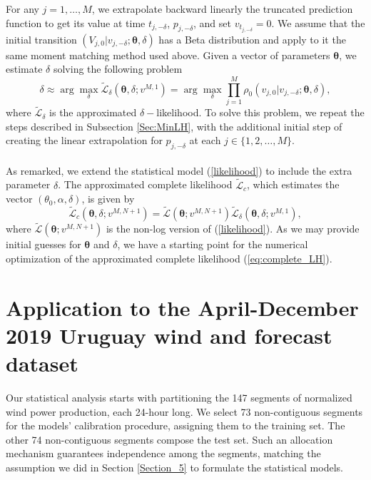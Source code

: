 \documentclass[11pt]{article}
\theoremstyle{definition}
\begin{document}
For any $j=1, \ldots, M$, we extrapolate backward linearly the truncated prediction function to get its value at time $t_{j,-\delta}$, $p_{j,-\delta}$, and set $v_{t_{j,-\delta}}=0$. We assume that the initial transition $(V_{j, 0}|v_{j,-\delta};\bm{\theta},\delta)$ 
has a Beta distribution and apply to it the same moment matching method used above. Given a vector of parameters $\bm{\theta}$, we estimate $\delta$ solving the following problem
\begin{equation}
\delta\approx\arg\max_{\delta}\tilde{\mathcal{L}}_{\delta}\left(\bm{\theta},\delta; v^{M,1}\right) = \arg\max_{\delta}\prod\limits_{j=1}^M \rho_0 \left(v_{j, 0}|v_{j,-\delta};\bm{\theta},\delta\right),
\label{eq:likelihood_delta}
\end{equation}
where $\tilde{\mathcal{L}}_\delta$ is the approximated $\delta-$likelihood. To solve this problem, we repeat the steps described in Subsection \ref{Sec:MinLH}, with the additional initial step of creating the linear extrapolation for $p_{j,-\delta}$ at each $j\in\{1,2,\dots,M\}$.\\
\quad\\
As remarked, we extend the statistical model (\ref{likelihood}) to include the extra parameter $\delta$. The approximated complete likelihood $\tilde{\mathcal{L}}_c$, which estimates the vector $(\theta_0,\alpha,\delta)$, is given by
\begin{equation}
\tilde{\mathcal{L}}_c\left(\bm{\theta},\delta; v^{M,N +1}\right)=\tilde{\mathcal{L}}\left(\bm{\theta}; v^{M,N +1}\right)\tilde{\mathcal{L}}_{\delta}\left(\bm{\theta},\delta; v^{M,1}\right),
\label{eq:complete_LH}
\end{equation}
where $\tilde{\mathcal{L}}\left(\bm{\theta}; v^{M,N +1}\right)$ is the non-log version of (\ref{likelihood}). As we may provide initial guesses for $\bm{\theta}$ and $\delta$, we have a starting point for the numerical optimization of the approximated complete likelihood (\ref{eq:complete_LH}).



\section{Application to the April-December 2019 Uruguay wind and forecast dataset} \label{Section_6}

Our statistical analysis starts with partitioning the 147 segments of normalized wind power production, each 24-hour long. We select 73 non-contiguous segments for the models' calibration procedure, assigning them to the training set. The other 74 non-contiguous segments compose the test set. Such an allocation mechanism guarantees independence among the segments, matching the assumption we did in Section \ref{Section_5} to formulate the statistical models.
\end{document}
